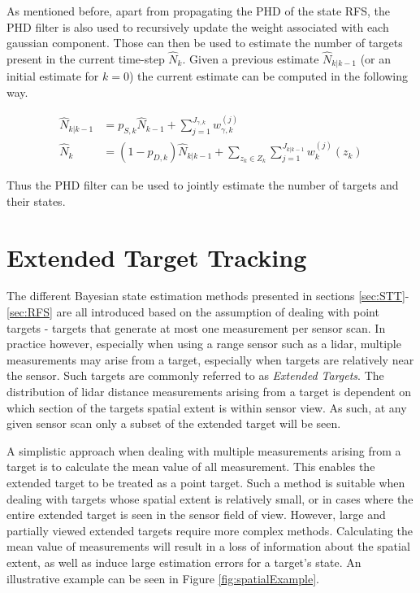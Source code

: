 As mentioned before, apart from propagating the PHD of the state RFS, the PHD filter is also used to recursively update the weight associated with each gaussian component. Those can then be used to estimate the number of targets present in the current time-step $\hat{N}_k$. Given a previous estimate $\hat{N}_{k|k-1}$ (or an initial estimate for $k=0$) the current estimate can be computed in the following way.\cite{Vo2006PHD}

\begin{equation}
\begin{split}
    \hat{N}_{k|k-1} &= p_{S,k}\hat{N}_{k-1} + \sum\limits_{j=1}^{J_{\gamma,k}} w^{(j)}_{\gamma,k}\\
    \hat{N}_k &= (1-p_{D,k})\hat{N}_{k|k-1} + \sum\limits_{z_k \in Z_k} \sum\limits_{j=1}^{J_{k|k-1}} w_k^{(j)}(z_k)
\end{split}
\end{equation}

Thus the PHD filter can be used to jointly estimate the number of targets and their states.


\newpage
\section{Extended Target Tracking}
The different Bayesian state estimation methods presented in sections \ref{sec:STT}-\ref{sec:RFS} are all introduced based on the assumption of dealing with point targets - targets that generate at most one measurement per sensor scan. In practice however, especially when using a range sensor such as a lidar, multiple measurements may arise from a target, especially when targets are relatively near the sensor. Such targets are commonly referred to as \emph{Extended Targets}. The distribution of lidar distance measurements arising from a target is dependent on which section of the targets spatial extent is within sensor view. As such, at any given sensor scan only a subset of the extended target will be seen. 

A simplistic approach when dealing with multiple measurements arising from a target is to calculate the mean value of all measurement. This enables the extended target to be treated as a point target. Such a method is suitable when dealing with targets whose spatial extent is relatively small, or in cases where the entire extended target is seen in the sensor field of view. However, large and partially viewed extended targets require more complex methods. Calculating the mean value of measurements will result in a loss of information about the spatial extent, as well as induce large estimation errors for a target's state. An illustrative example can be seen in Figure \ref{fig:spatialExample}. 

